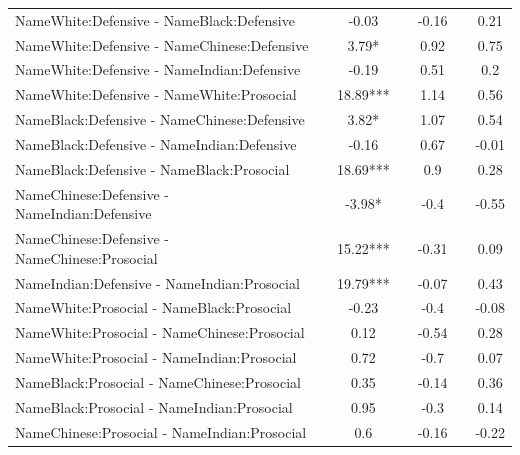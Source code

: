 \documentclass[]{report}
\begin{document}
\begin{table}
{\begin{tabular}[t]{lcccccc}
	NameWhite:Defensive - NameBlack:Defensive &  & -0.03 &  & -0.16 &  & 0.21 \\ 
	NameWhite:Defensive - NameChinese:Defensive &  & 3.79* &  & 0.92 &  & 0.75 \\ 
	NameWhite:Defensive - NameIndian:Defensive &  & -0.19 &  & 0.51 &  & 0.2 \\ 
	NameWhite:Defensive - NameWhite:Prosocial &  & 18.89*** &  & 1.14 &  & 0.56 \\ 
	NameBlack:Defensive - NameChinese:Defensive &  & 3.82* &  & 1.07 &  & 0.54 \\ 
	NameBlack:Defensive - NameIndian:Defensive &  & -0.16 &  & 0.67 &  & -0.01 \\ 
	NameBlack:Defensive - NameBlack:Prosocial &  & 18.69*** &  & 0.9 &  & 0.28 \\ 
	NameChinese:Defensive - NameIndian:Defensive &  & -3.98* &  & -0.4 &  & -0.55 \\ 
	NameChinese:Defensive - NameChinese:Prosocial &  & 15.22*** &  & -0.31 &  & 0.09 \\ 
	NameIndian:Defensive - NameIndian:Prosocial &  & 19.79*** &  & -0.07 &  & 0.43 \\ 
	NameWhite:Prosocial - NameBlack:Prosocial &  & -0.23 &  & -0.4 &  & -0.08 \\ 
	NameWhite:Prosocial - NameChinese:Prosocial &  & 0.12 &  & -0.54 &  & 0.28 \\ 
	NameWhite:Prosocial - NameIndian:Prosocial &  & 0.72 &  & -0.7 &  & 0.07 \\ 
	NameBlack:Prosocial - NameChinese:Prosocial &  & 0.35 &  & -0.14 &  & 0.36 \\ 
	NameBlack:Prosocial - NameIndian:Prosocial &  & 0.95 &  & -0.3 &  & 0.14 \\ 
	NameChinese:Prosocial - NameIndian:Prosocial &  & 0.6 &  & -0.16 &  & -0.22 \\ 
	\hline
	\end{tabular}}
\end{table}
\end{document}
